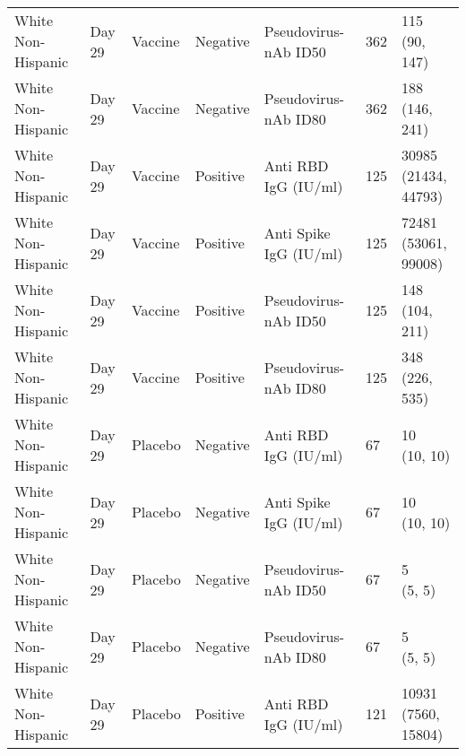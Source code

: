 \documentclass[]{book}
\theoremstyle{definition}
\theoremstyle{definition}
\theoremstyle{definition}
\newcommand{\1}{\mathbbm{1}}
\begin{document}
\begin{landscape}
\begin{ThreePartTable}
\begin{longtable}[t]{>{\raggedright\arraybackslash}p{7cm}llllll}
\hspace{1em}White Non-Hispanic & Day 29 & Vaccine & Negative & Pseudovirus-nAb ID50 & 362 & \makecell[l]{115\\(90, 147)}\\
\hspace{1em}White Non-Hispanic & Day 29 & Vaccine & Negative & Pseudovirus-nAb ID80 & 362 & \makecell[l]{188\\(146, 241)}\\
\hspace{1em}White Non-Hispanic & Day 29 & Vaccine & Positive & Anti RBD IgG (IU/ml) & 125 & \makecell[l]{30985\\(21434, 44793)}\\
\hspace{1em}White Non-Hispanic & Day 29 & Vaccine & Positive & Anti Spike IgG (IU/ml) & 125 & \makecell[l]{72481\\(53061, 99008)}\\
\hspace{1em}White Non-Hispanic & Day 29 & Vaccine & Positive & Pseudovirus-nAb ID50 & 125 & \makecell[l]{148\\(104, 211)}\\
\hspace{1em}White Non-Hispanic & Day 29 & Vaccine & Positive & Pseudovirus-nAb ID80 & 125 & \makecell[l]{348\\(226, 535)}\\
\hspace{1em}White Non-Hispanic & Day 29 & Placebo & Negative & Anti RBD IgG (IU/ml) & 67 & \makecell[l]{10\\(10, 10)}\\
\hspace{1em}White Non-Hispanic & Day 29 & Placebo & Negative & Anti Spike IgG (IU/ml) & 67 & \makecell[l]{10\\(10, 10)}\\
\hspace{1em}White Non-Hispanic & Day 29 & Placebo & Negative & Pseudovirus-nAb ID50 & 67 & \makecell[l]{5\\(5, 5)}\\
\hspace{1em}White Non-Hispanic & Day 29 & Placebo & Negative & Pseudovirus-nAb ID80 & 67 & \makecell[l]{5\\(5, 5)}\\
\hspace{1em}White Non-Hispanic & Day 29 & Placebo & Positive & Anti RBD IgG (IU/ml) & 121 & \makecell[l]{10931\\(7560, 15804)}\\

\end{longtable}
\end{ThreePartTable}
\end{landscape}
\end{document}
